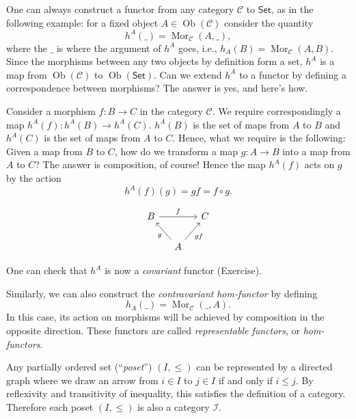 \documentclass[english,letterpaper]{article}%
\numberwithin{equation}{section}
\numberwithin{figure}{section}
\numberwithin{table}{section}
\theoremstyle{definition}
\theoremstyle{definition}
\theoremstyle{definition}
\theoremstyle{plain}
\theoremstyle{plain}
\theoremstyle{plain}
\theoremstyle{plain}
\theoremstyle{remark}
\theoremstyle{remark}
\renewcommand{\leq}{\leqslant}
\DeclareMathOperator{\mor}{Mor}
\DeclareMathOperator{\ob}{Ob}
\begin{document}
\begin{example}\label{hom-functor example}
\label{Representable functors} One can always construct a functor
from any category $\mathcal{C}$ to $\mathsf{Set}$, as in the following
example: for a fixed object $A\in\ob(\mathcal{C})$ consider the quantity
\begin{equation}
h^{A}(\_)=\mor_{\mathcal{C}}(A,\_),
\end{equation}
where the $\_$ is where the argument of $h^{A}$ goes, i.e., $h_{A}(B)=\mor_{\mathcal{C}}(A,B)$.
Since the morphisms between any two objects by definition form a set,
$h^{A}$ is a map from $\ob(\mathcal{C})$ to $\ob(\mathsf{Set})$.
Can we extend $h^{A}$ to a functor by defining a correspondence between
morphisms? The answer is yes, and here's how.

Consider a morphism $f:B\rightarrow C$ in the category $\mathcal{C}$.
We require correspondingly a map $h^{A}(f):h^{A}(B)\rightarrow h^{A}(C)$.
$h^{A}(B)$ is the set of maps from $A$ to $B$ and $h^{A}(C)$ is
the set of maps from $A$ to $C$. Hence, what we require is the following:
Given a map from $B$ to $C$, how do we transform a map $g:A\rightarrow B$
into a map from $A$ to $C$? The answer is composition, of course! Hence the map $h^{A}(f)$ acts on $g$ by the action
\begin{equation}
h^{A}(f)(g)=gf=f\circ g.
\end{equation}

\begin{equation}
\begin{tikzcd}[column sep=small] 
B \arrow[rr, "f"] & & C\\
& A \arrow[lu, "g"] \arrow[ru, "gf"'] & 
\end{tikzcd}
\end{equation}

One can check that $h^{A}$ is now a \emph{covariant} functor (Exercise).

Similarly, we can also construct the \emph{contravariant} \emph{hom-functor}
by defining\begin{equation} 
h_A(\_) = \mor_\mathcal{C}(\_, A). 
\end{equation} In this case, its action on morphisms will be achieved by composition
in the opposite direction. These functors are called \emph{representable
functors}, or \emph{hom-functors}.
\end{example}
%
\begin{example}\label{poset example}
Any partially ordered set (``\emph{poset}'') $\left(I,\leq\right)$
can be represented by a directed graph where we draw an arrow from
$i\in I$ to $j\in I$ if and only if $i\leq j$. By reflexivity and
transitivity of inequality, this satisfies the definition of a category.
Therefore each poset $(I,\leq)$ is also a category $\mathcal{I}$.
\end{example}
\end{document}
